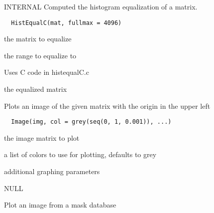 \documentclass[a4paper]{book}
\begin{document}
%
\begin{Description}\relax
INTERNAL Computed the histogram equalization of a matrix.
\end{Description}
%
\begin{Usage}
\begin{verbatim}
  HistEqualC(mat, fullmax = 4096)
\end{verbatim}
\end{Usage}
%
\begin{Arguments}
\begin{ldescription}
\item[\code{mat}] the matrix to equalize

\item[\code{fullmax}] the range to equalize to
\end{ldescription}
\end{Arguments}
%
\begin{Details}\relax
Uses C code in histequalC.c
\end{Details}
%
\begin{Value}
the equalized matrix
\end{Value}
%
\begin{Description}\relax
Plots an image of the given matrix with the origin in the
upper left
\end{Description}
%
\begin{Usage}
\begin{verbatim}
  Image(img, col = grey(seq(0, 1, 0.001)), ...)
\end{verbatim}
\end{Usage}
%
\begin{Arguments}
\begin{ldescription}
\item[\code{img}] the image matrix to plot

\item[\code{col}] a list of colors to use for plotting, defaults
to grey

\item[\code{...}] additional graphing parameters
\end{ldescription}
\end{Arguments}
%
\begin{Value}
NULL
\end{Value}
%
\begin{Description}\relax
Plot an image from a mask database
\end{Description}
\end{document}
